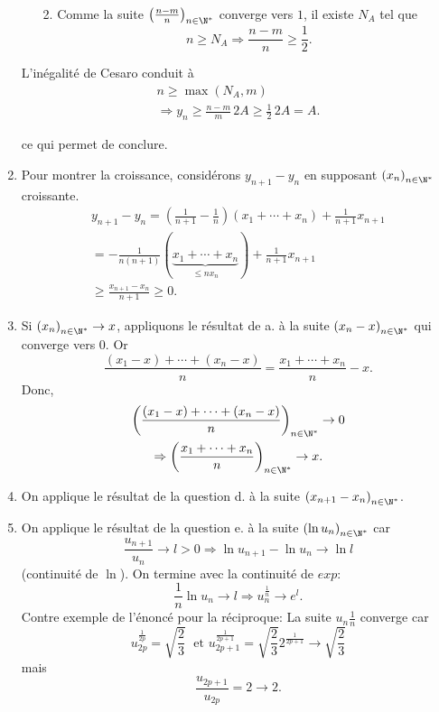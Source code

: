 \begin{enumerate}
\begin{itemize}
 \item [2.] Comme la suite $\left( \frac{n-m}{n} \right)_{n \in \N^*}$ converge vers $1$, il existe $N_A$ tel que 
\[
 n \geq N_A 
 \Rightarrow \frac{n - m}{n} \geq \frac{1}{2}.
\]
\end{itemize}
L'inégalité de Cesaro conduit à
\begin{multline*}
 n \geq \max(N_{A},m) \\
 \Rightarrow y_n \geq  \frac{n-m}{m}\,2A \geq \frac{1}{2}\, 2A =A.
\end{multline*}

ce qui permet de conclure.

 \item Pour montrer la croissance, considérons $y_{n+1} - y_n$ en supposant $\left( x_n \right)_{n \in \N^*}$ croissante.
\begin{multline*}
 y_{n+1} - y_n 
 = (\frac{1}{n+1} - \frac{1}{n})(x_1 + \cdots +x_n) + \frac{1}{n+1}x_{n+1} \\
 = -\frac{1}{n(n+1)}(\underset{\leq n x_n}{\underbrace{x_1 + \cdots +x_n}}) + \frac{1}{n+1}x_{n+1}\\
 \geq \frac{x_{n+1} - x_n}{n+1} \geq 0.
\end{multline*}

 \item Si $\left( x_n \right)_{n \in \N^*} \rightarrow x$, appliquons le résultat de a. à la suite $\left( x_n -x \right)_{n \in \N^*}$ qui converge vers 0. Or
\[
 \frac{(x_1-x) + \cdots + (x_n-x)}{n} = \frac{x_1 +\cdots + x_n}{n}- x.
\]
Donc,
\begin{multline*}
 \left( \frac{(x_1-x) + \cdots + (x_n-x)}{n} \right)_{n \in \N^*} \rightarrow 0 \\
 \Rightarrow \left( \frac{x_1 + \cdots + x_n}{n} \right)_{n \in \N^*} \rightarrow x.
\end{multline*}

 \item On applique le résultat de la question d. à la suite $\left( x_{n+1} - x_n \right)_{n \in \N^*}$. 
 \item On applique le résultat de la question e. à la suite $\left( \ln u_n \right)_{n \in \N^*}$ car
\[
 \frac{u_{n+1}}{u_n} \rightarrow l> 0 \Rightarrow \ln u_{n+1} - \ln u_n \rightarrow \ln l
\]
(continuité de $\ln$). On termine avec la continuité de $exp$:
\[
 \frac{1}{n}\ln u_n \rightarrow l \Rightarrow u_n^{\frac{1}{n}} \rightarrow e^{l}.
\]
Contre exemple de l'énoncé pour la réciproque:\newline
La suite $u_n\frac{1}{n}$ converge car 
\[
 u_{2p}^{\frac{1}{2p}} = \sqrt{\frac{2}{3}} \; 
\text{ 
et }
 u_{2p+1}^{\frac{1}{2p+1}} = \sqrt{\frac{2}{3}} 2^{\frac{1}{2p+1}} \rightarrow \sqrt{\frac{2}{3}} 
\]
mais
\[
 \frac{u_{2p+1}}{u_{2p}} = 2 \rightarrow 2.
\]


\end{enumerate}

